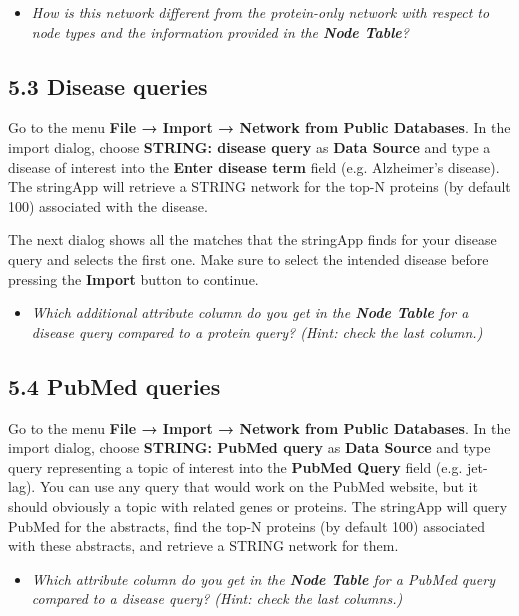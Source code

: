 \documentclass[a4paper]{article}
\begin{document}
\begin{itemize}
  \item \textit{How is this network different from the protein-only network with respect to node types and the information provided in the \textbf{Node Table}?}
\end{itemize}

\subsection*{5.3 Disease queries}

Go to the menu \textbf{File → Import → Network from Public Databases}. In the import dialog, choose \textbf{STRING: disease query} as \textbf{Data Source} and type a disease of interest into the \textbf{Enter disease term} field (e.g. Alzheimer’s disease). The stringApp will retrieve a STRING network for the top-N proteins (by default 100) associated with the disease.

The next dialog shows all the matches that the stringApp finds for your disease query and selects the first one. Make sure to select the intended disease before pressing the \textbf{Import} button to continue.

\begin{itemize}
  \item \textit{Which additional attribute column do you get in the \textbf{Node Table} for a disease query compared to a protein query? (Hint: check the last column.)}
\end{itemize}

\subsection*{5.4 PubMed queries}

Go to the menu \textbf{File → Import → Network from Public Databases}. In the import dialog, choose \textbf{STRING: PubMed query} as \textbf{Data Source} and type query representing a topic of interest into the \textbf{PubMed Query} field (e.g. jet-lag). You can use any query that would work on the PubMed website, but it should obviously a topic with related genes or proteins. The stringApp will query PubMed for the abstracts, find the top-N proteins (by default 100) associated with these abstracts, and retrieve a STRING network for them.

\begin{itemize}
  \item \textit{Which attribute column do you get in the \textbf{Node Table} for a PubMed query compared to a disease query? (Hint: check the last columns.)}
\end{itemize}
\end{document}

